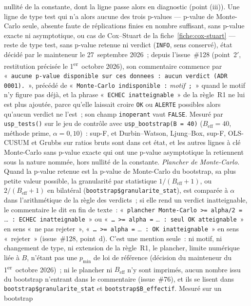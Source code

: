 \documentclass[a4paper,11pt]{article}
\newcommand{\code}[1]{\texttt{\small #1}}
\begin{document}
nullité de la constante, dont la ligne passe alors en diagnostic (point (iii)). Une ligne de type
test qui n'a alors aucune des trois p-values --- p-value de Monte-Carlo seule, absente faute de
réplications finies en nombre suffisant, sans p-value exacte ni asymptotique, ou cas de
Cox--Stuart de la fiche~\ref{fiche:cox-stuart} --- reste de type test, sans p-value retenue ni
verdict (\code{INFO}, sens conservé), état décidé par le mainteneur le 27~septembre 2026~; depuis
l'issue~\#128 (point~2$'$, restitution précisée le 1\textsuperscript{er}~octobre 2026), son
commentaire commence par «~\code{aucune p-value disponible sur ces donnees~: aucun verdict (ADR
0001).}~», précédé de «~\code{Monte-Carlo indisponible~:} \emph{motif}~\code{;}~» quand le motif
n'y figure pas déjà, et la phrase «~\code{ECHEC inatteignable}~» de la règle~R1 ne lui est plus
ajoutée, parce qu'elle laissait croire \code{OK} ou \code{ALERTE} possibles alors qu'aucun verdict
ne l'est~; son champ \code{inoperant} vaut \code{FALSE}. Mesuré par \code{usp\_tests()} sur le
jeu de contrôle avec \code{usp\_bootstrap(B = 40)} ($B_{\text{eff}} = 40$, méthode prime,
$\alpha = 0{,}10$)~: sup-F, et Durbin--Watson, Ljung--Box, sup-F, OLS-CUSUM et Grubbs sur ratios
bruts sont dans cet état, et les autres lignes à clé Monte-Carlo sans p-value exacte qui ont
une p-value asymptotique la retiennent sous la nature nommée, hors nullité de la constante. \emph{Plancher de Monte-Carlo.} Quand la p-value retenue est la p-value de Monte-Carlo
du bootstrap, sa plus petite valeur possible, la granularité par statistique $1/(B_{\text{eff}}
+ 1)$, ou $2/(B_{\text{eff}} + 1)$ en bilatéral (\code{bootstrap\$granularite\_stat}), est
comparée à $\alpha$ dans l'arithmétique de la règle des verdicts~; si elle rend un verdict
inatteignable, le commentaire le dit en fin de texte~: «~\code{plancher Monte-Carlo >= alpha/2 =}
\ldots~\code{: ECHEC inatteignable}~» ou «~\code{\ldots{} >= alpha =} \ldots~\code{: seul OK
atteignable}~» en sens «~ne pas rejeter~», «~\code{\ldots{} >= alpha =} \ldots~\code{: OK
inatteignable}~» en sens «~rejeter~» (issue~\#128, point~d). C'est une mention seule~: ni motif,
ni changement de type, ni extension de la règle~R1, le plancher, limite numérique liée à $B$,
n'étant pas une $p_{\min}$ de loi de référence (décision du mainteneur du
1\textsuperscript{er}~octobre 2026)~; ni le plancher ni $B_{\text{eff}}$ n'y sont imprimés, aucun
nombre issu du bootstrap n'entrant dans le commentaire (issue~\#76), et ils se lisent dans
\code{bootstrap\$granularite\_stat} et \code{bootstrap\$B\_effectif}. Mesuré sur un bootstrap
\end{document}
